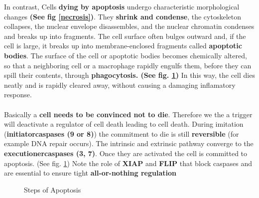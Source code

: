 \documentclass[../main.tex]{subfiles}
\begin{document}
In contrast, Cells \textbf{dying by \gls{apoptosis}} undergo characteristic morphological changes \textbf{(See fig \ref{necrosis})}. They \textbf{shrink and condense}, the cytoskeleton collapses, the nuclear envelope disassembles, and the nuclear chromatin condenses and breaks up into fragments. The cell surface often bulges outward and, if the cell is large, it breaks up into membrane-enclosed fragments called \textbf{apoptotic bodies}. The surface of the cell or apoptotic bodies becomes chemically altered, so that a neighboring cell or a macrophage rapidly engulfs them, before they can spill their contents, through \textbf{phagocytosis. (See fig. \ref{apoptosis-steps})} In this way, the cell dies neatly and is rapidly cleared away, without causing a damaging inflamatory response. \\
\\
\indent Basically a \textbf{cell needs to be convinced not to die}. Therefore we the a trigger will deactivate a regulator of cell death leading to cell death. During imitation (\textbf{\gls{initiatorcaspases} (9 or 8)}) the commitment to die is still \textbf{reversible} (for example DNA repair occurs). The intrinsic and extrinsic pathway converge to the \textbf{\gls{executionercaspases} (3, 7)}. Once they are activated the cell is committed to apoptosis. (See fig. \ref{apoptosis-steps}) Note the role of \textbf{\gls{XIAP}} and \textbf{\gls{FLIP}} that block caspases and are essential to ensure tight \textbf{all-or-nothing regulation}
\begin{figure}[H]
	\centering
	\caption{Steps of Apoptosis}
	\label{apoptosis-steps}
\end{figure}
\end{document}
